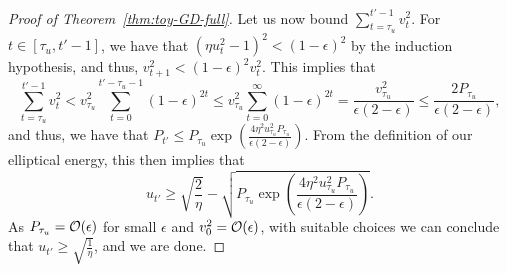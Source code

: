\begin{proof}[Proof of Theorem~\ref{thm:toy-GD-full}]
    Let us now bound $\sum_{t = \tau_u}^{t' - 1} v_t^2$.
    For $t \in [\tau_u, t' - 1]$, we have that $(\eta u_t^2 - 1)^2 < (1 - \epsilon)^2$ by the induction hypothesis, and thus, $v_{t+1}^2 < (1 - \epsilon)^2 v_t^2$.
    This implies that
     \begin{equation*}
        \sum_{t = \tau_u}^{t' - 1} v_t^2 < v_{\tau_u}^2 \sum_{t = 0}^{t' - \tau_u - 1} (1 - \epsilon)^{2t}
        \leq v_{\tau_u}^2 \sum_{t = 0}^\infty (1 - \epsilon)^{2t}
        = \frac{v_{\tau_u}^2}{\epsilon(2 - \epsilon)}
        \leq \frac{2 P_{\tau_u}}{\epsilon(2 - \epsilon)},
    \end{equation*}
    and thus, we have that $P_{t'} \leq P_{\tau_u} \exp\left( \frac{4\eta^2 u_{\tau_u}^2 P_{\tau_u}}{\epsilon(2 - \epsilon)} \right)$.
    From the definition of our elliptical energy, this then implies that
    \begin{equation}
        u_{t'} \geq \sqrt{\frac{2}{\eta}} - \sqrt{P_{\tau_u} \exp\left( \frac{4\eta^2 u_{\tau_u}^2 P_{\tau_u}}{\epsilon(2 - \epsilon)} \right)}.
    \end{equation}
    As $P_{\tau_u} = {\mathcal{O}}(\epsilon)$ for small $\epsilon$ and $v_0^2 = {\mathcal{O}}(\epsilon)$, with suitable choices we can conclude that $u_{t'} \geq \sqrt{\frac{1}{\eta}}$, and we are done.
\end{proof}



